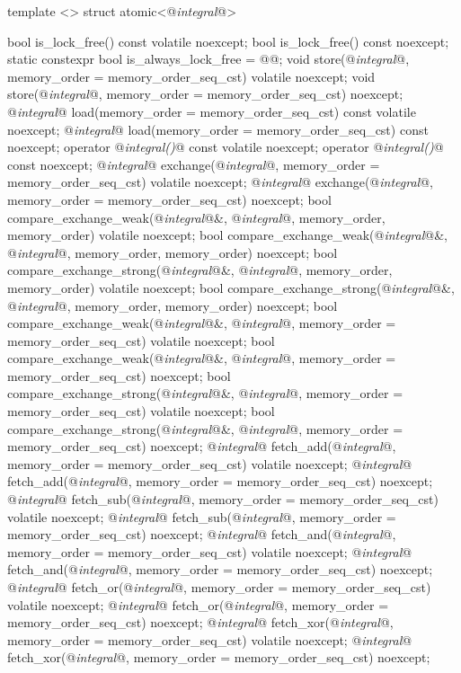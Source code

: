 \begin{codeblock}
{  template <> struct atomic<@\textit{integral}@> {
    bool is_lock_free() const volatile noexcept;
    bool is_lock_free() const noexcept;
    static constexpr bool is_always_lock_free = @\impdef{}@;
    void store(@\textit{integral}@, memory_order = memory_order_seq_cst) volatile noexcept;
    void store(@\textit{integral}@, memory_order = memory_order_seq_cst) noexcept;
    @\textit{integral}@ load(memory_order = memory_order_seq_cst) const volatile noexcept;
    @\textit{integral}@ load(memory_order = memory_order_seq_cst) const noexcept;
    operator @\textit{integral()}@ const volatile noexcept;
    operator @\textit{integral()}@ const noexcept;
    @\textit{integral}@ exchange(@\textit{integral}@, memory_order = memory_order_seq_cst) volatile noexcept;
    @\textit{integral}@ exchange(@\textit{integral}@, memory_order = memory_order_seq_cst) noexcept;
    bool compare_exchange_weak(@\textit{integral}@&, @\textit{integral}@, memory_order, memory_order) volatile noexcept;
    bool compare_exchange_weak(@\textit{integral}@&, @\textit{integral}@, memory_order, memory_order) noexcept;
    bool compare_exchange_strong(@\textit{integral}@&, @\textit{integral}@, memory_order, memory_order) volatile noexcept;
    bool compare_exchange_strong(@\textit{integral}@&, @\textit{integral}@, memory_order, memory_order) noexcept;
    bool compare_exchange_weak(@\textit{integral}@&, @\textit{integral}@, memory_order = memory_order_seq_cst) volatile noexcept;
    bool compare_exchange_weak(@\textit{integral}@&, @\textit{integral}@, memory_order = memory_order_seq_cst) noexcept;
    bool compare_exchange_strong(@\textit{integral}@&, @\textit{integral}@, memory_order = memory_order_seq_cst) volatile noexcept;
    bool compare_exchange_strong(@\textit{integral}@&, @\textit{integral}@, memory_order = memory_order_seq_cst) noexcept;
    @\textit{integral}@ fetch_add(@\textit{integral}@, memory_order = memory_order_seq_cst) volatile noexcept;
    @\textit{integral}@ fetch_add(@\textit{integral}@, memory_order = memory_order_seq_cst) noexcept;
    @\textit{integral}@ fetch_sub(@\textit{integral}@, memory_order = memory_order_seq_cst) volatile noexcept;
    @\textit{integral}@ fetch_sub(@\textit{integral}@, memory_order = memory_order_seq_cst) noexcept;
    @\textit{integral}@ fetch_and(@\textit{integral}@, memory_order = memory_order_seq_cst) volatile noexcept;
    @\textit{integral}@ fetch_and(@\textit{integral}@, memory_order = memory_order_seq_cst) noexcept;
    @\textit{integral}@ fetch_or(@\textit{integral}@, memory_order = memory_order_seq_cst) volatile noexcept;
    @\textit{integral}@ fetch_or(@\textit{integral}@, memory_order = memory_order_seq_cst) noexcept;
    @\textit{integral}@ fetch_xor(@\textit{integral}@, memory_order = memory_order_seq_cst) volatile noexcept;
    @\textit{integral}@ fetch_xor(@\textit{integral}@, memory_order = memory_order_seq_cst) noexcept;

}}
\end{codeblock}
